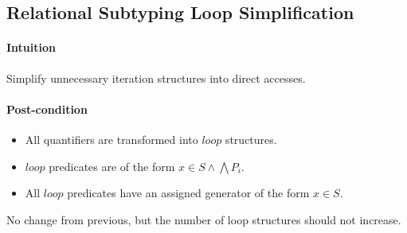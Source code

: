 \subsection{Relational Subtyping Loop Simplification}

\paragraph{Intuition} Simplify unnecessary iteration structures into direct accesses.

\paragraph{Post-condition}
\begin{itemize}
  \item All quantifiers are transformed into $loop$ structures.
  \item $loop$ predicates are of the form $x \in S \land \bigwedge P_i$.
  \item All $loop$ predicates have an assigned generator of the form $x \in S$.
\end{itemize}
No change from previous, but the number of loop structures should not increase.

